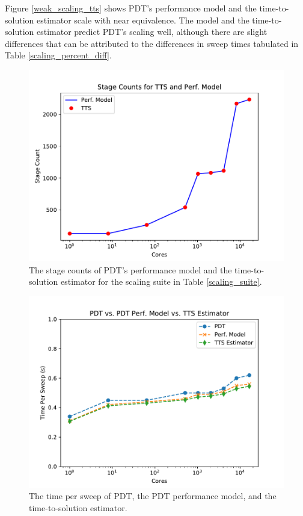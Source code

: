 Figure \ref{weak_scaling_tts} shows PDT's performance model and the time-to-solution estimator scale with near equivalence. The model and the time-to-solution estimator predict PDT's scaling well, although there are slight differences that can be attributed to the differences in sweep times tabulated in Table \ref{scaling_percent_diff}.
\begin{figure}[ht]
\centering
\includegraphics[scale=0.8]{../../figures/scaling_stagecount.pdf}
\caption{The stage counts of PDT's performance model and the time-to-solution estimator for the scaling suite in Table \ref{scaling_suite}.}
\label{scaling_stagecount}
\end{figure}
\begin{figure}[ht]
\centering
\includegraphics[scale=0.8]{../../figures/scaling_tts_sweep_times.pdf}
\caption{The time per sweep of PDT, the PDT performance model, and the time-to-solution estimator.}
\label{weak_scaling_tts_sweep}
\end{figure}
